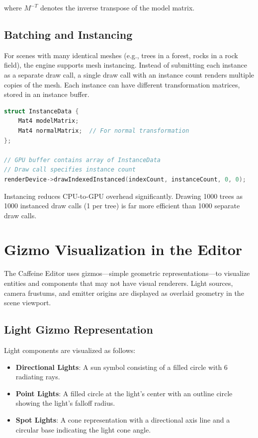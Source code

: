 where $M^{-T}$ denotes the inverse transpose of the model matrix.

\subsection{Batching and Instancing}

For scenes with many identical meshes (e.g., trees in a forest, rocks in a rock field), the engine supports mesh instancing. Instead of submitting each instance as a separate draw call, a single draw call with an instance count renders multiple copies of the mesh. Each instance can have different transformation matrices, stored in an instance buffer.

\begin{lstlisting}[language=C++, caption=Instance Buffer Layout]
struct InstanceData {
    Mat4 modelMatrix;
    Mat4 normalMatrix;  // For normal transformation
};

// GPU buffer contains array of InstanceData
// Draw call specifies instance count
renderDevice->drawIndexedInstanced(indexCount, instanceCount, 0, 0);
\end{lstlisting}

Instancing reduces CPU-to-GPU overhead significantly. Drawing 1000 trees as 1000 instanced draw calls (1 per tree) is far more efficient than 1000 separate draw calls.

\section{Gizmo Visualization in the Editor}

The Caffeine Editor uses gizmos—simple geometric representations—to visualize entities and components that may not have visual renderers. Light sources, camera frustums, and emitter origins are displayed as overlaid geometry in the scene viewport.

\subsection{Light Gizmo Representation}

Light components are visualized as follows:

\begin{itemize}
    \item \textbf{Directional Lights}: A sun symbol consisting of a filled circle with 6 radiating rays.
    \item \textbf{Point Lights}: A filled circle at the light's center with an outline circle showing the light's falloff radius.
    \item \textbf{Spot Lights}: A cone representation with a directional axis line and a circular base indicating the light cone angle.
\end{itemize}

